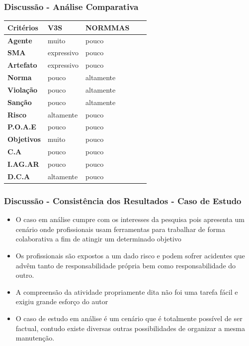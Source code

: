 \documentclass{beamer}
\begin{document}
\begin{frame}
	\frametitle{Discussão - Análise Comparativa}
	\begin{table}[H]
		\centering
		\begin{tabular}{|l|l|l|l|l|}
			\hline
			\textbf{Critérios}     & \textbf{V3S}         & \textbf{NORMMAS}          \\ \hline
			\textbf{Agente}        & muito                & pouco                     \\ \hline
			\textbf{SMA}           & expressivo           & pouco                     \\ \hline
			\textbf{Artefato}      & expressivo           & pouco                     \\ \hline
			\textbf{Norma}         & pouco                & altamente                 \\ \hline
			\textbf{Violação}      & pouco                & altamente                 \\ \hline
			\textbf{Sanção}        & pouco                & altamente                 \\ \hline
			\textbf{Risco}         & altamente            & pouco                     \\ \hline
			\textbf{P.O.A.E}       & pouco                & pouco                     \\ \hline
			\textbf{Objetivos}     & muito                & pouco                     \\ \hline
			\textbf{C.A}           & pouco                & pouco                     \\ \hline
			\textbf{I.AG.AR}       & pouco                & pouco                    \\ \hline
			\textbf{D.C.A}         & altamente            & pouco					\\ \hline
		\end{tabular}
	\end{table}
\end{frame}


\begin{frame}
	\frametitle{Discussão - Consistência dos Resultados - Caso de Estudo}
	\begin{itemize}
		\item  O caso em análise cumpre com os interesses da pesquisa pois apresenta um cenário onde profissionais usam ferramentas para trabalhar de forma colaborativa a fim de atingir um determinado objetivo
		\item Os profissionais são expostos a um dado risco e podem sofrer acidentes que advêm tanto de responsabilidade própria bem como responsabilidade do outro.
		\item A compreensão da atividade propriamente dita não foi uma tarefa fácil e exigiu grande esforço do autor
		\item O caso de estudo em análise é um cenário que é totalmente possível de ser factual, contudo existe diversas outras possibilidades de organizar a mesma manutenção.
	\end{itemize}
\end{frame}
\end{document}

